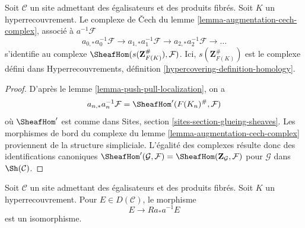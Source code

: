 \begin{lemma}
\label{lemma-hypercovering-cech-complex}
Soit $\mathcal{C}$ un site admettant des égalisateurs et des produits fibrés.
Soit $K$ un hyperrecouvrement. Le complexe de Čech
du lemme \ref{lemma-augmentation-cech-complex}, associé à
$a^{-1}\mathcal{F}$
$$
a_{0, *}a_0^{-1}\mathcal{F} \to a_{1, *}a_1^{-1}\mathcal{F} \to
a_{2, *}a_2^{-1}\mathcal{F} \to \ldots
$$
s'identifie au complexe $\SheafHom(s(\mathbf{Z}_{F(K)}^\#), \mathcal{F})$.
Ici, $s(\mathbf{Z}_{F(K)}^\#)$ est le complexe défini dans
Hyperrecouvrements, définition \ref{hypercovering-definition-homology}.
\end{lemma}

\begin{proof}
D'après le lemme \ref{lemma-push-pull-localization}, on a
$$
a_{n, *}a_n^{-1}\mathcal{F} = \SheafHom'(F(K_n)^\#, \mathcal{F})
$$
où $\SheafHom'$ est comme dans Sites, section \ref{sites-section-glueing-sheaves}.
Les morphismes de bord du complexe du
lemme \ref{lemma-augmentation-cech-complex}
proviennent de la structure simpliciale.
L'égalité des complexes résulte donc
des identifications canoniques
$\SheafHom'(\mathcal{G}, \mathcal{F}) =
\SheafHom(\mathbf{Z}_\mathcal{G}, \mathcal{F})$ pour
$\mathcal{G}$ dans $\Sh(\mathcal{C})$.
\end{proof}

\begin{lemma}
\label{lemma-hypercovering-descent-bounded-abelian}
Soit $\mathcal{C}$ un site admettant des égalisateurs et des produits fibrés.
Soit $K$ un hyperrecouvrement. Pour
$E \in D(\mathcal{C})$, le morphisme
$$
E \longrightarrow Ra_*a^{-1}E
$$
est un isomorphisme.
\end{lemma}


